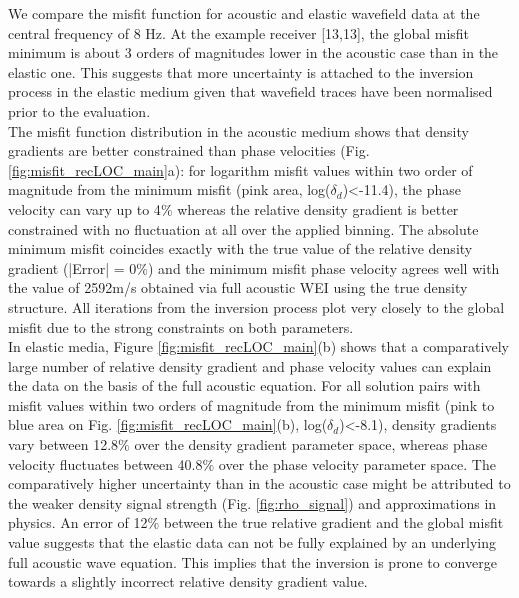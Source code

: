 \documentclass{article}
\begin{document}
	 We compare the misfit function for acoustic and elastic wavefield data at the central frequency of 8 Hz. At the example receiver [13,13], the global misfit minimum is about 3 orders of magnitudes lower in the acoustic case than in the elastic one. This suggests that more uncertainty is attached to the inversion process in the elastic medium given that wavefield traces have been normalised prior to the evaluation.\\
	 
	 The misfit function distribution in the acoustic medium shows that density gradients are better constrained than phase velocities (Fig. \ref{fig:misfit_recLOC_main}a): for logarithm misfit values within two order of magnitude from the minimum misfit (pink area, log($\delta_{d}$)<-11.4), the phase velocity can vary up to 4$\%$ whereas the relative density gradient is better constrained with no fluctuation at all over the applied binning. The absolute minimum misfit coincides exactly with the true value of the relative density gradient (|Error| = 0$\%$) and the minimum misfit phase velocity agrees well with the value of 2592m/s obtained via full acoustic WEI using the true density structure. All iterations from the inversion process plot very closely to the global misfit due to the strong constraints on both parameters.  \\
	 
	 In elastic media, Figure \ref{fig:misfit_recLOC_main}(b) shows that a comparatively large number of relative density gradient and phase velocity values can explain the data on the basis of the full acoustic equation. For all solution pairs with misfit values within two orders of magnitude from the minimum misfit (pink to blue area on Fig. \ref{fig:misfit_recLOC_main}(b), log($\delta_{d}$)<-8.1), density gradients vary between 12.8$\%$ over the density gradient parameter space, whereas phase velocity fluctuates between 40.8$\%$ over the phase velocity parameter space. The comparatively higher uncertainty than in the acoustic case might be attributed to the weaker density signal strength (Fig. \ref{fig:rho_signal}) and approximations in physics. An error of 12$\%$ between the true relative gradient and the global misfit value suggests that the elastic data can not be fully explained by an underlying full acoustic wave equation. This implies that the inversion is prone to converge towards a slightly incorrect relative density gradient value.
	 
\end{document}
